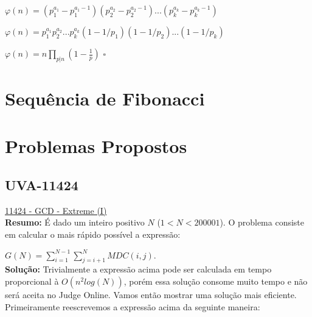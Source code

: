 $\varphi(n) = (p_1^{a_1} - p_1^{a_1-1})(p_2^{a_2} - p_2^{a_2-1})...(p_k^{a_k} - p_k^{a_k-1})$

$\varphi(n) = p_1^{a_1}p_2^{a_2}...p_k^{a_k}(1 - 1/p_1)(1 - 1/p_2)...(1 - 1/p_k)$

$\varphi(n) = n \prod_{p|n}(1 - \frac{1}{p})$ $\square$


\section{Sequência de Fibonacci}

\begin{definition}
\end{definition}



\section{Problemas Propostos}


\subsection{UVA-11424}
\href{https://uva.onlinejudge.org/index.php?option=onlinejudge&page=show_problem&problem=2419}{11424 - GCD - Extreme (I)} \\

\textbf{Resumo:}
É dado um inteiro positivo $N$ ($1 < N < 200001$). O problema consiste em calcular o mais rápido possível a expressão:

$G(N) = \sum_{i=1}^{N-1}\sum_{j=i+1}^{N}MDC(i,j)$.
\\

\textbf{Solução:}
Trivialmente a expressão acima pode ser calculada em tempo proporcional à $O(n^2log(N))$, porém essa solução consome muito tempo e não será aceita no Judge Online. Vamos então mostrar uma solução mais eficiente.
\\

Primeiramente reescrevemos a expressão acima da seguinte maneira:

